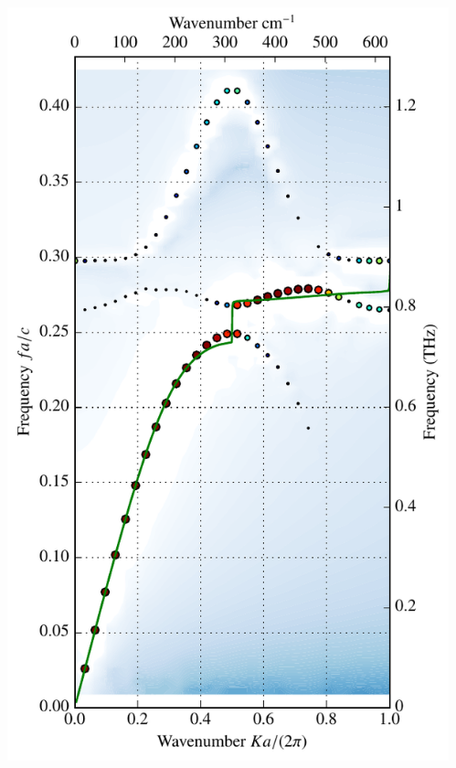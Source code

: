 \documentclass[t]{beamer} \usepackage[english]{babel} \usepackage[utf8]{inputenc} \usetheme{Frankfurt} %
\begin{document}
\begin{frame}[plain]{}
\begin{columns}[T]
\begin{column}{.55\textwidth}
	\end{column}%
	\begin{column}{.45\textwidth}%
		\vspace{-1mm}\includegraphics[height=\paperheight]{../img-cdh-new/CDH_SRRArray_10.pdf} 
	\end{column}
\end{columns}
\end{frame} 		%
\end{document}
